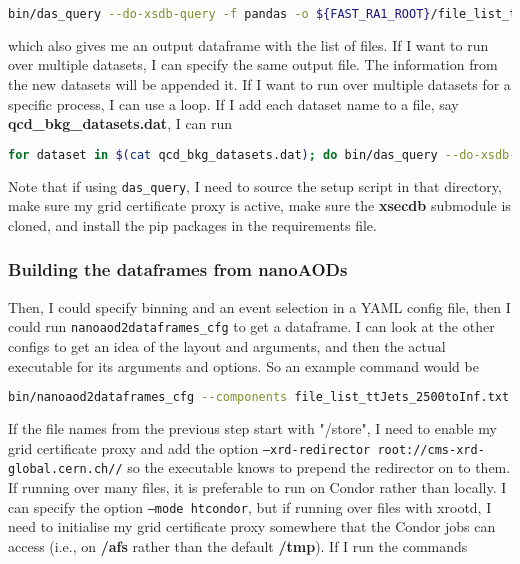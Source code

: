 \begin{lstlisting}[belowskip=-0.7cm, language=sh, numbers=none]
bin/das_query --do-xsdb-query -f pandas -o ${FAST_RA1_ROOT}/file_list_ttJets_2500toInf.txt /TTJets_HT-2500toInf_TuneCUETP8M1_13TeV-madgraphMLM-pythia8/RunIISummer16NanoAOD-PUMoriond17_05Feb2018_94X_mcRun2_asymptotic_v2_ext1-v1/NANOAODSIM
\end{lstlisting}

which also gives me an output dataframe with the list of files. If I want to run over multiple datasets, I can specify the same output file. The information from the new datasets will be appended it. If I want to run over multiple datasets for a specific process, I can use a loop. If I add each dataset name to a file, say \textbf{qcd\_bkg\_datasets.dat}, I can run

\begin{lstlisting}[belowskip=-0.7cm, language=sh, numbers=none]
for dataset in $(cat qcd_bkg_datasets.dat); do bin/das_query --do-xsdb-query -f pandas -o ./qcd_bkg_file_list.txt $dataset; done
\end{lstlisting}

Note that if using \texttt{das\_query}, I need to source the setup script in that directory, make sure my grid certificate proxy is active, make sure the \textbf{xsecdb} submodule is cloned, and install the pip packages in the requirements file.


\subsubsection{Building the dataframes from nanoAODs}

Then, I could specify binning and an event selection in a YAML config file, then I could run \texttt{nanoaod2dataframes\_cfg} to get a dataframe. I can look at the other configs to get an idea of the layout and arguments, and then the actual executable for its arguments and options. So an example command would be

\begin{lstlisting}[belowskip=-0.7cm, language=sh, numbers=none]
bin/nanoaod2dataframes_cfg --components file_list_ttJets_2500toInf.txt --dont-use-nanoaodtools -o single_top_test fast_ra1/trees_to_dataframe/configs/nanoaod_esh_ttH.yaml
\end{lstlisting}

If the file names from the previous step start with "/store", I need to enable my grid certificate proxy and add the option \texttt{--xrd-redirector root://cms-xrd-global.cern.ch//} so the executable knows to prepend the redirector on to them. If running over many files, it is preferable to run on Condor rather than locally. I can specify the option \texttt{--mode htcondor}, but if running over files with xrootd, I need to initialise my grid certificate proxy somewhere that the Condor jobs can access (i.e., on \textbf{/afs} rather than the default \textbf{/tmp}). If I run the commands

